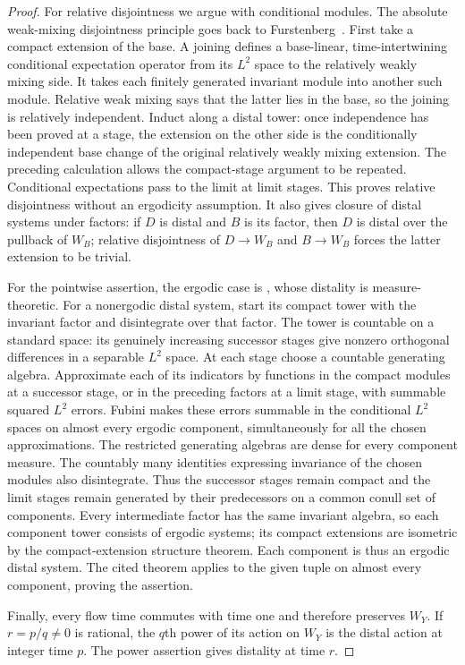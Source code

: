 \begin{proof}
For relative disjointness we argue with conditional modules.  The
absolute weak-mixing disjointness principle goes back to
Furstenberg~\cite[Part~I, Section~7]{FurstenbergDisjointness}.
First take a compact extension of the base.  A joining defines a
base-linear, time-intertwining conditional
expectation operator from its $L^2$ space to the relatively weakly
mixing side.  It takes each finitely generated invariant module into
another such module.  Relative weak mixing says that the latter lies
in the base, so the joining is relatively independent.  Induct along
a distal tower: once independence has been proved at a stage, the
extension on the other side is the conditionally independent base
change of the original relatively weakly mixing extension.  The
preceding calculation allows the compact-stage argument to be
repeated.  Conditional expectations pass to the limit at limit
stages.  This proves relative disjointness without an ergodicity
assumption.  It also gives closure of distal systems under factors:
if $D$ is distal and $B$ is its factor, then $D$ is distal over the
pullback of $W_B$; relative disjointness of $D\to W_B$ and
$B\to W_B$ forces the latter extension to be trivial.

For the pointwise assertion, the ergodic case is
\cite[Theorem~C]{HuangShaoYe}, whose distality is measure-theoretic.
For a nonergodic distal system, start its compact tower with the
invariant factor and disintegrate over that factor.  The tower is
countable on a standard space: its genuinely increasing successor
stages give nonzero orthogonal differences in a separable $L^2$
space.  At each stage choose a countable generating algebra.  Approximate
each of its indicators by functions in the compact modules at a
successor stage, or in the preceding factors at a limit stage, with
summable squared $L^2$ errors.  Fubini makes these errors summable in
the conditional $L^2$ spaces on almost every ergodic component,
simultaneously for all the chosen approximations.  The restricted
generating algebras are dense for every component measure.  The
countably many identities expressing invariance of the chosen modules
also disintegrate.  Thus the successor stages remain compact and the
limit stages remain generated by their predecessors on a common
conull set of components.  Every intermediate factor has the same invariant
algebra, so each component tower consists of ergodic systems; its
compact extensions are isometric by the compact-extension structure
theorem.  Each component is thus an ergodic distal system.
The cited theorem applies to the given tuple on almost every
component, proving the assertion.

Finally, every flow time commutes with time one and therefore
preserves $W_Y$.  If $r=p/q\ne0$ is rational, the $q$th power of
its action on $W_Y$ is the distal action at integer time $p$.
The power assertion gives distality at time $r$.
\end{proof}

